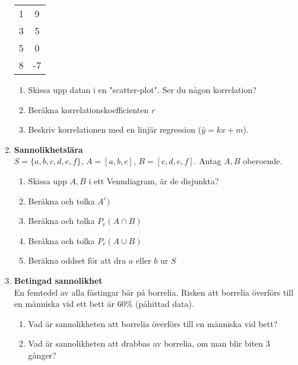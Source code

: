 \documentclass[a4paper,10pt]{article}
\begin{document}
\begin{enumerate}
{\begin{table}
\begin{tabular}[H]{c|c}
        1                        & 9                           \\
        3                        & 5                           \\
        5                       & 0                           \\
        8                       & -7
        \end{tabular}
    \end{table}
  }
    \begin{enumerate}
        \item{Skissa upp datan i en "scatter-plot". Ser du någon korrelation?}
        \newpage
        \item{Beräkna korrelationskoefficienten $r$}
        \newpage
        \item{Beskriv korrelationen med en linjär regression ($\hat{y}=kx+m$).}
    \end{enumerate}
\newpage
    \item{{\bf Sannolikhetslära} \\ $S=\{a, b, c, d, e, f\}$, $A=[a, b, c]$, $B=[c, d, e, f]$. Antag $A, B$ oberoende.}
    \begin{enumerate}
        \item{Skissa upp $A, B$ i ett Venndiagram, är de disjunkta?}
        \vspace{6cm}
        \item{Beräkna och tolka $A^c)$}
        \vspace{3cm}
        \item{Beräkna och tolka $P_r(A \cap B)$}
        \vspace{3cm}
        \item{Beräkna och tolka $P_r(A \cup B)$}
        \vspace{3cm}
        \item{Beräkna oddset för att dra $a$ eller $b$ ur $S$}
    \end{enumerate}
    \newpage
    \item{{\bf Betingad sannolikhet}\\En femtedel av alla fästingar bär på borrelia. Risken att borrelia överförs till en människa vid ett bett är $60\%$ (påhittad data)}. \\
    \begin{enumerate}
        \item{Vad är sannolikheten att borrelia överförs till en människa vid bett?}
        \vspace{6cm}
        \item{Vad är sannolikheten att drabbas av borrelia, om man blir biten $3$ gånger?}

\end{enumerate}
\end{enumerate}
\end{document}
